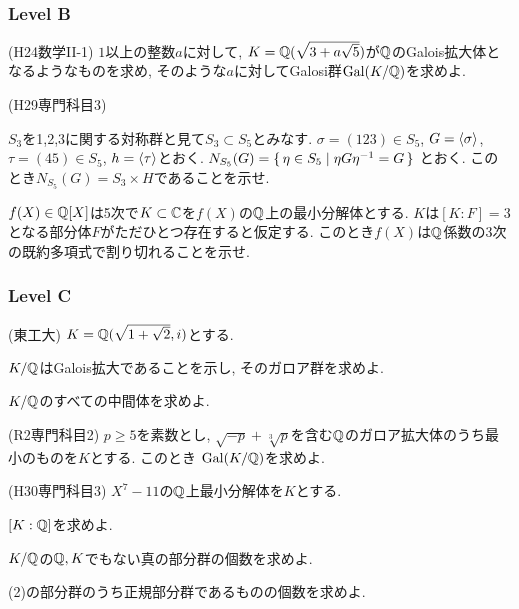 \subsubsection{Level B}
\begin{prob} (H24数学II-1)
$1$以上の整数$a$に対して, $K=\mathbb{Q}(\sqrt{3+a\sqrt{5}})$が$\mathbb{Q}$のGalois拡大体となるようなものを求め, そのような$a$に対してGalosi群$\mathrm{Gal}(K/\mathbb{Q})$を求めよ.
\end{prob}

\begin{prob} (H29専門科目3) \label{prob:H29senmon-3}
\ben
\item $S_3$を1,2,3に関する対称群と見て$S_3\subset S_5$とみなす. $\sigma = (123)\in S_5$, $G = \langle \sigma \rangle$, $\tau = (45)\in S_5$, $h=\langle \tau\rangle$とおく.
$N_{S_5}(G) = \set{\eta\in S_5 \mid \eta G \eta^{-1} = G}$ とおく. このとき$N_{S_5}(G) = S_3\times H$であることを示せ.
\item $f(X)\in \mathbb{Q}[X]$は5次で$K\subset \mathbb{C}$を$f(X)$の$\mathbb{Q}$上の最小分解体とする. $K$は$[K:F] = 3$となる部分体$F$がただひとつ存在すると仮定する. このとき$f(X)$は$\mathbb{Q}$係数の3次の既約多項式で割り切れることを示せ.
\een
\end{prob}

\subsubsection{Level C}

\begin{prob} (東工大)
$K=\mathbb{Q}(\sqrt{1+\sqrt{2}}, i)$とする.
\ben
\item $K/\mathbb{Q}$はGalois拡大であることを示し, そのガロア群を求めよ.
\item $K/\mathbb{Q}$のすべての中間体を求めよ.
\een
\end{prob}


\begin{prob} (R2専門科目2) \label{prob:R2-senmon-2}
$p\geq 5$を素数とし, $\sqrt{-p}+\sqrt[3]{p}$を含む$\mathbb{Q}$のガロア拡大体のうち最小のものを$K$とする. このとき
$\mathrm{Gal}(K/\mathbb{Q})$を求めよ.
\end{prob}

\begin{prob} (H30専門科目3) \label{prob:H30senmon-3}
$X^7-11$の$\mathbb{Q}$上最小分解体を$K$とする.
\ben
\item $[K:\mathbb{Q}]$を求めよ.
\item $K/\mathbb{Q}$の$\mathbb{Q},K$でもない真の部分群の個数を求めよ.
\item (2)の部分群のうち正規部分群であるものの個数を求めよ.
\een

\end{prob}


